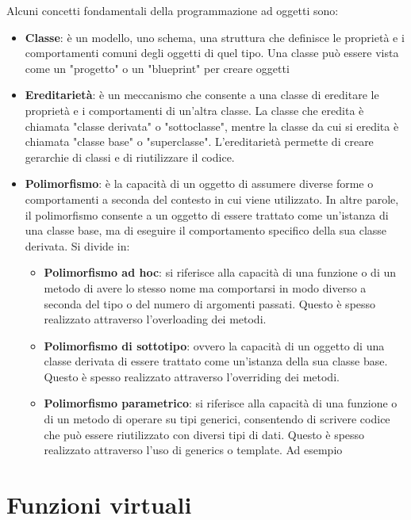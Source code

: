 \documentclass{report}
\begin{document}
Alcuni concetti fondamentali della programmazione ad oggetti sono:
\begin{itemize}
    \item \textbf{Classe}: è un modello, uno schema, una struttura che definisce le proprietà e i comportamenti comuni degli oggetti di quel tipo. Una classe può essere vista come un "progetto" o un "blueprint" per creare oggetti
    \item \textbf{Ereditarietà}: è un meccanismo che consente a una classe di ereditare le proprietà e i comportamenti di un'altra classe. La classe che eredita è chiamata "classe derivata" o "sottoclasse", mentre la classe da cui si eredita è chiamata "classe base" o "superclasse". L'ereditarietà permette di creare gerarchie di classi e di riutilizzare il codice.
    \item \textbf{Polimorfismo}: è la capacità di un oggetto di assumere diverse forme o comportamenti a seconda del contesto in cui viene utilizzato. In altre parole, il polimorfismo consente a un oggetto di essere trattato come un'istanza di una classe base, ma di eseguire il comportamento specifico della sua classe derivata. Si divide in:
    \begin{itemize}
        \item \textbf{Polimorfismo ad hoc}: si riferisce alla capacità di una funzione o di un metodo di avere lo stesso nome ma comportarsi in modo diverso a seconda del tipo o del numero di argomenti passati. Questo è spesso realizzato attraverso l'overloading dei metodi.
        \item \textbf{Polimorfismo di sottotipo}: ovvero la capacità di un oggetto di una classe derivata di essere trattato come un'istanza della sua classe base. Questo è spesso realizzato attraverso l'overriding dei metodi.
        \item \textbf{Polimorfismo parametrico}: si riferisce alla capacità di una funzione o di un metodo di operare su tipi generici, consentendo di scrivere codice che può essere riutilizzato con diversi tipi di dati. Questo è spesso realizzato attraverso l'uso di generics o template. Ad esempio
    \end{itemize}
\end{itemize}
\section{Funzioni virtuali}
\end{document}
